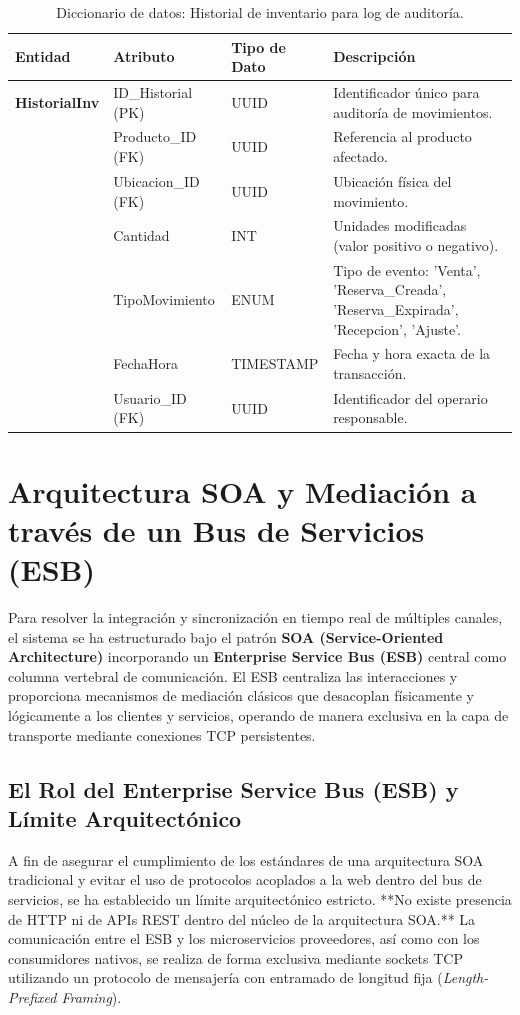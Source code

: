 \documentclass[12pt,a4paper]{article}
\begin{document}
\begin{table}[h!]
\centering
\small
\begin{tabularx}{\textwidth}{@{}lllX@{}}
\toprule
\textbf{Entidad} & \textbf{Atributo} & \textbf{Tipo de Dato} & \textbf{Descripción} \\ \midrule
\textbf{HistorialInv} & ID\_Historial (PK) & UUID & Identificador único para auditoría de movimientos. \\
 & Producto\_ID (FK) & UUID & Referencia al producto afectado. \\
 & Ubicacion\_ID (FK) & UUID & Ubicación física del movimiento. \\
 & Cantidad & INT & Unidades modificadas (valor positivo o negativo). \\
 & TipoMovimiento & ENUM & Tipo de evento: 'Venta', 'Reserva\_Creada', 'Reserva\_Expirada', 'Recepcion', 'Ajuste'. \\
 & FechaHora & TIMESTAMP & Fecha y hora exacta de la transacción. \\
 & Usuario\_ID (FK) & UUID & Identificador del operario responsable. \\ \bottomrule
\end{tabularx}
\caption{Diccionario de datos: Historial de inventario para log de auditoría.}
\end{table}
\clearpage

\section{Arquitectura SOA y Mediación a través de un Bus de Servicios (ESB)}
Para resolver la integración y sincronización en tiempo real de múltiples canales, el sistema se ha estructurado bajo el patrón \textbf{SOA (Service-Oriented Architecture)} incorporando un \textbf{Enterprise Service Bus (ESB)} central como columna vertebral de comunicación. El ESB centraliza las interacciones y proporciona mecanismos de mediación clásicos que desacoplan físicamente y lógicamente a los clientes y servicios, operando de manera exclusiva en la capa de transporte mediante conexiones TCP persistentes.

\subsection{El Rol del Enterprise Service Bus (ESB) y Límite Arquitectónico}
A fin de asegurar el cumplimiento de los estándares de una arquitectura SOA tradicional y evitar el uso de protocolos acoplados a la web dentro del bus de servicios, se ha establecido un límite arquitectónico estricto. **No existe presencia de HTTP ni de APIs REST dentro del núcleo de la arquitectura SOA.** La comunicación entre el ESB y los microservicios proveedores, así como con los consumidores nativos, se realiza de forma exclusiva mediante sockets TCP utilizando un protocolo de mensajería con entramado de longitud fija (\textit{Length-Prefixed Framing}).
\end{document}
